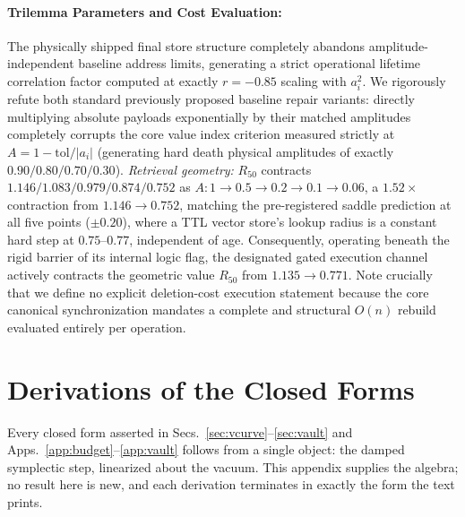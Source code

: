 \documentclass{article}
\begin{document}
\paragraph{Trilemma Parameters and Cost Evaluation:} The physically shipped final store structure completely abandons amplitude-independent baseline address limits, generating a strict operational lifetime correlation factor computed at exactly $r=-0.85$ scaling with $a_i^2$. We rigorously refute both standard previously proposed baseline repair variants: directly multiplying absolute payloads exponentially by their matched amplitudes completely corrupts the core value index criterion measured strictly at $A=1-\text{tol}/|a_i|$ (generating hard death physical amplitudes of exactly $0.90/0.80/0.70/0.30$). \emph{Retrieval geometry:} $R_{50}$ contracts $1.146/1.083/0.979/0.874/0.752$ as $A:1\to0.5\to0.2\to0.1\to0.06$, a $1.52\times$ contraction from $1.146\to0.752$, matching the pre-registered saddle prediction at all five points ($\pm0.20$), where a TTL vector store's lookup radius is a constant hard step at $0.75$--$0.77$, independent of age. Consequently, operating beneath the rigid barrier of its internal logic flag, the designated gated execution channel actively contracts the geometric value $R_{50}$ from $1.135\to0.771$. Note crucially that we define no explicit deletion-cost execution statement because the core canonical synchronization mandates a complete and structural $O(n)$ rebuild evaluated entirely per operation.

\section{Derivations of the Closed Forms}\label{app:derivation}

Every closed form asserted in Secs.~\ref{sec:vcurve}--\ref{sec:vault} and Apps.~\ref{app:budget}--\ref{app:vault} follows from a single object: the damped symplectic step, linearized about the vacuum. This appendix supplies the algebra; no result here is new, and each derivation terminates in exactly the form the text prints.
\end{document}
